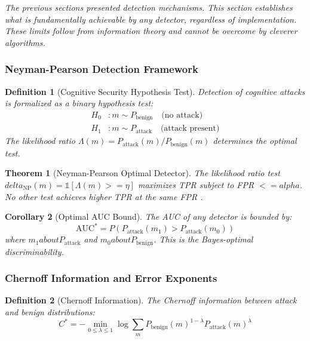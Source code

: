 \documentclass[
]{article}
\newtheorem{definition}{Definition}[section]
\newtheorem{theorem}{Theorem}[section]
\newtheorem{corollary}[theorem]{Corollary}
\begin{document}
\emph{The previous sections presented detection mechanisms. This section
establishes what is fundamentally achievable by any detector, regardless
of implementation. These limits follow from information theory and
cannot be overcome by cleverer algorithms.}

\subsubsection{Neyman-Pearson Detection
Framework}\label{neyman-pearson-detection-framework}

\begin{definition}[Cognitive Security Hypothesis Test]
\label{def:hyp-test}
Detection of cognitive attacks is formalized as a binary hypothesis test:
\begin{align}
\label{eq:hyp-test}
H_0 &: m \sim P_{\text{benign}} \quad \text{(no attack)} \\
H_1 &: m \sim P_{\text{attack}} \quad \text{(attack present)}
\end{align}
The likelihood ratio $\Lambda(m) = P_{\text{attack}}(m) / P_{\text{benign}}(m)$ determines the optimal test.
\end{definition}

\begin{theorem}[Neyman-Pearson Optimal Detector]
\label{thm:np-detector}
The likelihood ratio test $delta_{\text{NP}}(m) = \mathbb{1}[\Lambda(m) >= \eta]$ maximizes TPR subject to FPR $<= alpha$. No other test achieves higher TPR at the same FPR \cite{neyman1933ix}.
\end{theorem}

\begin{corollary}[Optimal AUC Bound]
\label{cor:optimal-auc}
The AUC of any detector is bounded by:
\begin{equation}
\label{eq:optimal-auc}
\text{AUC}^* = P(P_{\text{attack}}(m_1) > P_{\text{attack}}(m_0))
\end{equation}
where $m_1 about P_{\text{attack}}$ and $m_0 about P_{\text{benign}}$. This is the Bayes-optimal discriminability.
\end{corollary}

\subsubsection{Chernoff Information and Error
Exponents}\label{chernoff-information-and-error-exponents}

\begin{definition}[Chernoff Information]
\label{def:chernoff}
The Chernoff information between attack and benign distributions:
\begin{equation}
\label{eq:chernoff}
C^* = -\min_{0 \leq \lambda \leq 1} \log \sum_m P_{\text{benign}}(m)^{1-\lambda} P_{\text{attack}}(m)^\lambda
\end{equation}
\end{definition}
\end{document}
